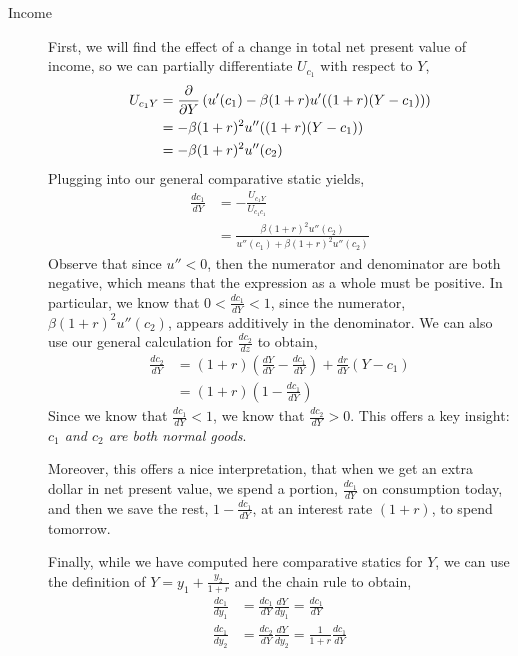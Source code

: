 \begin{description}
    \item[Income] First, we will find the effect of a change in total net present value of income, so we can partially differentiate $U_{c_1}$ with respect to $Y$,
    \begin{align*}
        U_{c_1 Y} &= \frac{\partial }{\partial Y} \left(u'(c_1) - \beta (1 + r) u'((1 + r)(Y - c_1))\right) \\
        &= - \beta (1 + r)^2 u''((1 + r)(Y - c_1))  \\
        &= - \beta (1 + r)^2 u''(c_2)
    \end{align*}
    Plugging into our general comparative static yields,
    \begin{align*}
        \frac{dc_1}{dY} &= - \frac{U_{c_1 Y}}{U_{c_1 c_1}} \\
        &= \frac{\beta (1 + r)^2 u''(c_2)}{u''(c_1) + \beta (1+r)^2 u''(c_2)}
    \end{align*}
    Observe that since $u'' < 0$, then the numerator and denominator are both negative, which means that the expression as a whole must be positive. In particular, we know that $0  < \frac{dc_1}{dY} < 1$, since the numerator, $\beta (1 + r)^2 u''(c_2)$, appears additively in the denominator. We can also use our general calculation for $\frac{dc_2}{dz}$ to obtain,
    \begin{align*}
        \frac{dc_2}{dY} &= (1 + r)\left(\frac{dY}{dY} - \frac{dc_1}{dY}\right) + \frac{dr}{dY}(Y - c_1) \\
        &= (1 + r) \left(1 - \frac{dc_1}{dY}\right)
    \end{align*}
    Since we know that $\frac{dc_1}{dY} < 1$, we know that $\frac{dc_2}{dY} > 0$. This offers a key insight: 
    \emph{$c_1$ and $c_2$ are both normal goods}. 

    Moreover, this offers a nice interpretation, that when we get an extra dollar in net present value, we spend a portion, $\frac{dc_1}{dY}$ on consumption today, and then we save the rest, $1 - \frac{dc_1}{dY}$, at an interest rate $(1 + r)$, to spend tomorrow. 

    Finally, while we have computed here comparative statics for $Y$, we can use the definition of $Y = y_1 + \frac{y_2}{1 + r}$ and the chain rule to obtain,
    \begin{align*}
        \frac{dc_1}{dy_1} &= \frac{dc_1}{dY} \frac{dY}{dy_1} = \frac{dc_1}{dY} \\
        \frac{dc_1}{dy_2} &= \frac{dc_2}{dY} \frac{dY}{dy_2} = \frac{1}{1 + r} \frac{dc_1}{dY}
    \end{align*}
 

\end{description}
